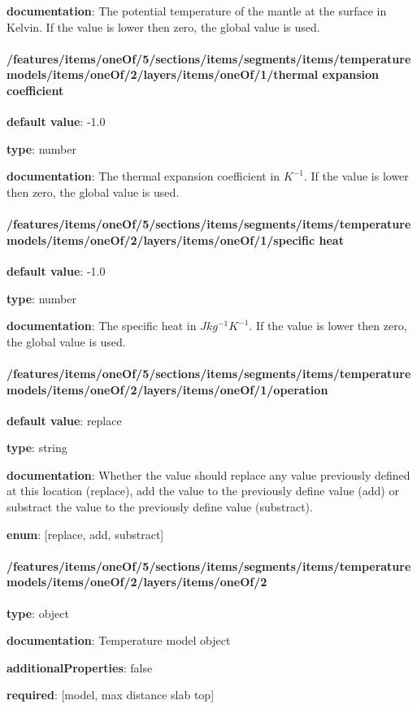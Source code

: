 \begin{itemized}
\item {\bf documentation}: The potential temperature of the mantle at the surface in Kelvin. If the value is lower then zero, the global value is used.
\end{itemized}\paragraph{/features/items/oneOf/5/sections/items/segments/items/temperature models/items/oneOf/2/layers/items/oneOf/1/thermal expansion coefficient} \begin{itemized}
\item {\bf default value}: -1.0
\item {\bf type}: number
\item {\bf documentation}: The thermal expansion coefficient in $K^{-1}$. If the value is lower then zero, the global value is used.
\end{itemized}\paragraph{/features/items/oneOf/5/sections/items/segments/items/temperature models/items/oneOf/2/layers/items/oneOf/1/specific heat} \begin{itemized}
\item {\bf default value}: -1.0
\item {\bf type}: number
\item {\bf documentation}: The specific heat in $J kg^{-1} K^{-1}$. If the value is lower then zero, the global value is used.
\end{itemized}\paragraph{/features/items/oneOf/5/sections/items/segments/items/temperature models/items/oneOf/2/layers/items/oneOf/1/operation} \begin{itemized}
\item {\bf default value}: replace
\item {\bf type}: string
\item {\bf documentation}: Whether the value should replace any value previously defined at this location (replace), add the value to the previously define value (add) or substract the value to the previously define value (substract).
\item {\bf enum}: [replace, add, substract]\end{itemized}\paragraph{/features/items/oneOf/5/sections/items/segments/items/temperature models/items/oneOf/2/layers/items/oneOf/2} \begin{itemized}
\item {\bf type}: object
\item {\bf documentation}: Temperature model object
\item {\bf additionalProperties}: false
\item {\bf required}: [model, max distance slab top]\end{itemized}
